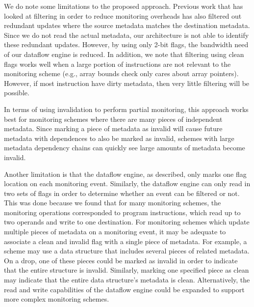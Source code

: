 We do note some limitations to the proposed approach. Previous work
\cite{fade-hpca14} that has looked at filtering in order to reduce monitoring
overheads has also filtered out redundant updates where the source metadata
matches the destination metadata. Since we do not read the actual metadata, our
architecture is not able to identify these redundant updates. However, by using
only 2-bit flags, the bandwidth need of our dataflow engine is reduced.  
In addition, we note that filtering using clean flags works well when a large
portion of instructions are not relevant to the monitoring scheme (e.g., array
bounds check only cares about array pointers). However, if most instruction
have dirty metadata, then very little filtering will be possible. 

In terms of using invalidation to perform partial monitoring, this 
approach works best for monitoring schemes where there are many pieces of
independent metadata. Since marking a piece of metadata as invalid will cause
future metadata with dependences to also be marked as invalid, schemes with
large metadata dependency chains can quickly see large amounts of metadata
become invalid. 

Another limitation is that the dataflow engine, as described, only marks one
flag location on each monitoring event. Similarly, the dataflow engine can only
read in two sets of flags in order to determine whether an event can be
filtered or not. This was done because we found that for many monitoring
schemes, the monitoring operations corresponded to program instructions, which
read up to two operands and write to one destination.  For monitoring schemes
which update multiple pieces of metadata on a monitoring event, it may be
adequate to associate a clean and invalid flag with a single piece of metadata.  For
example, a scheme may use a data structure that includes several pieces of
related metadata. On a drop, one of these pieces could be marked as invalid in
order to indicate that the entire structure is invalid.  Similarly, marking one
specified piece as clean may indicate that the entire data structure's metadata
is clean.  Alternatively, the read and write capabilities of the dataflow
engine could be expanded to support more complex monitoring schemes.
